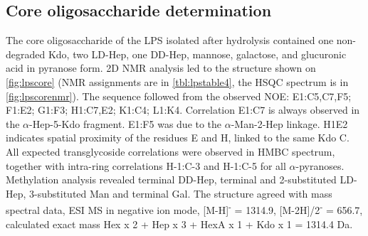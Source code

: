         \subsection{Core oligosaccharide determination} %
        \label{sub:core_oligosaccharide_determination}

        The core oligosaccharide of the \caulobacter{} \ac{LPS} isolated after  hydrolysis
        contained one non-degraded Kdo, two LD-Hep, one DD-Hep, mannose, galactose, and glucuronic acid in
        pyranose form. 2D \ac{NMR} analysis led to the structure shown on \cref{fig:lpscore} (\ac{NMR}
        assignments are in \cref{tbl:lpstable4}, the \ac{HSQC} spectrum is in \cref{fig:lpscorenmr}). The
        sequence followed from the observed \ac{NOE}: E1:C5,C7,F5; F1:E2; G1:F3; H1:C7,E2; K1:C4;
        L1:K4. Correlation E1:C7 is always observed in the $\alpha$-Hep-5-Kdo fragment. E1:F5 was due to
        the $\alpha$-Man-2-Hep linkage. H1E2 indicates spatial proximity of the residues E and H, linked
        to the same Kdo C. All expected transglycoside correlations were observed in \ac{HMBC} spectrum,
        together with intra-ring correlations H-1:C-3 and H-1:C-5 for all $\alpha$-pyranoses. Methylation
        analysis revealed terminal DD-Hep, terminal and 2-substituted LD-Hep, 3-substituted Man and
        terminal Gal. The structure agreed with mass spectral data, \ac{ESI} \ac{MS} in negative ion mode,
        [M-H]\textsuperscript{-} = 1314.9, [M-2H]/2\textsuperscript{-} = 656.7, calculated exact mass Hex
        x 2 + Hep x 3 + HexA x 1 + Kdo x 1 = 1314.4 Da.

